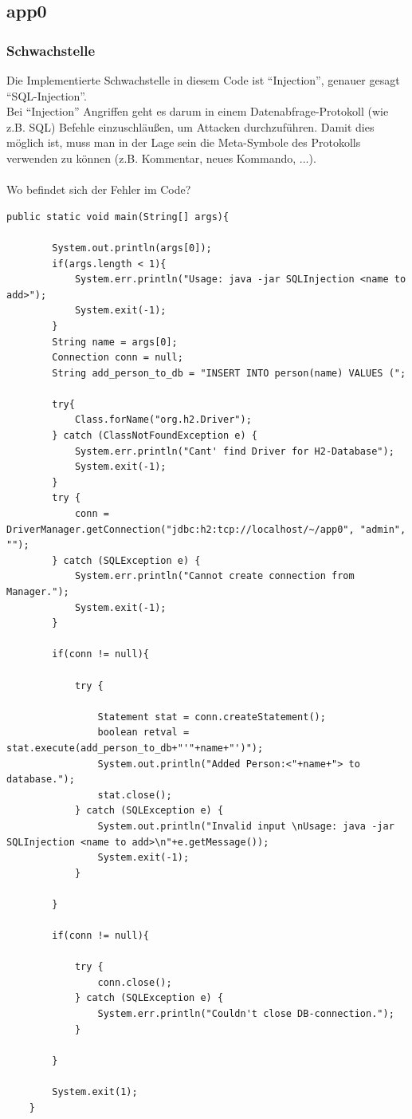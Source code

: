 \documentclass[12pt,a4paper,titlepage,oneside]{scrartcl}
\begin{document}
\subsection{app0}

\subsubsection{Schwachstelle}

Die Implementierte Schwachstelle in diesem Code ist "`Injection"', genauer gesagt "`SQL-Injection"'. \\
Bei "`Injection"' Angriffen geht es darum in einem Datenabfrage-Protokoll (wie z.B. SQL) Befehle einzuschläußen, um Attacken durchzuführen. Damit dies möglich ist, muss man in der Lage sein die Meta-Symbole des Protokolls verwenden zu können (z.B. Kommentar, neues Kommando, ...). \\
\\
Wo befindet sich der Fehler im Code?

\begin{lstlisting}[caption=Code mit Schwachstelle,label=code:app0a,style=c]
public static void main(String[] args){

		System.out.println(args[0]);
        if(args.length < 1){
            System.err.println("Usage: java -jar SQLInjection <name to add>");
            System.exit(-1);
        }
        String name = args[0];
        Connection conn = null;
        String add_person_to_db = "INSERT INTO person(name) VALUES (";

        try{
            Class.forName("org.h2.Driver");
        } catch (ClassNotFoundException e) {
            System.err.println("Cant' find Driver for H2-Database");
            System.exit(-1);
        }
        try {
            conn = DriverManager.getConnection("jdbc:h2:tcp://localhost/~/app0", "admin", "");
        } catch (SQLException e) {
            System.err.println("Cannot create connection from Manager.");
            System.exit(-1);
        }

        if(conn != null){

            try {

                Statement stat = conn.createStatement();
                boolean retval = stat.execute(add_person_to_db+"'"+name+"')");
                System.out.println("Added Person:<"+name+"> to database.");
                stat.close();
            } catch (SQLException e) {
                System.out.println("Invalid input \nUsage: java -jar SQLInjection <name to add>\n"+e.getMessage());
                System.exit(-1);
            }

        }

        if(conn != null){

            try {
                conn.close();
            } catch (SQLException e) {
                System.err.println("Couldn't close DB-connection.");
            }

        }

        System.exit(1);
    }
\end{lstlisting}
\end{document}

